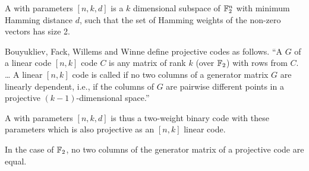 \begin{Definition}
\label{def-two-weight-codes}
\cite{BouFFWW2006, CalK1986, Del72weights, Din2015, Ton96uniformly}

A  with parameters $[n,k,d]$ is a $k$ dimensional subspace of $\mathbb{F}_2^n$
with
minimum Hamming distance $d$, such that the set of Hamming weights of the non-zero vectors has size
2.

Bouyukliev, Fack, Willems and Winne \cite[p. 60]{BouFFWW2006} define projective codes as follows.
``A  $G$ of a linear code $[n, k]$ code $C$ is any matrix
of rank $k$ (over $\mathbb{F}_2$) with rows from $C.$ \ldots
A linear $[n, k]$ code is called  if no two columns of a generator matrix
$G$ are linearly dependent, i.e., if the columns of $G$ are pairwise different points in a
projective $(k-1)$-dimensional space.''

A  with parameters $[n, k, d]$ is thus a
two-weight binary code with these parameters which is also projective as an $[n, k]$ linear code.
%
%
%
\end{Definition}

\begin{Remark}
In the case of $\mathbb{F}_2$, no two columns of the generator matrix of a projective code are equal.
\end{Remark}


